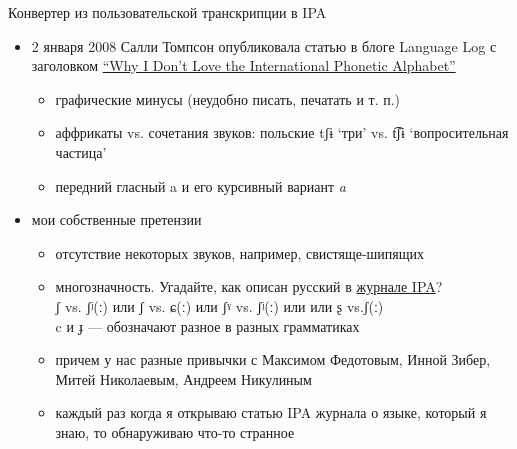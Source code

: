 \documentclass[13pt, t]{beamer}
\begin{document}
\begin{frame}{Конвертер из пользовательской транскрипции в IPA}
\begin{itemize}
\item 2 января 2008 Салли Томпсон опубликовала статью в блоге Language Log с заголовком \href{http://itre.cis.upenn.edu/~myl/languagelog/archives/005287.html}{``Why I Don't Love the International Phonetic Alphabet''}
\begin{itemize}
\item графические минусы (неудобно писать, печатать и т. п.)
\item аффрикаты vs. сочетания звуков: польские {\Large tʃɨ} `три' vs. {\Large t͡ʃɨ} `вопросительная частица'
\item передний гласный {\Large a} \pause и его курсивный вариант {\Large \textit{a}} \pause
\end{itemize}
\item мои собственные претензии
\begin{itemize}
\item отсутствие некоторых звуков, например, свистяще-шипящих
\item многозначность. Угадайте, как описан русский в \href{https://www.cambridge.org/core/services/aop-cambridge-core/content/view/55589EC639ADEF1764B5ECD0B76970FA/S0025100314000395a.pdf/russian.pdf}{журнале IPA}?\\
{\Large ʃ} vs. {\Large ʃʲ(ː)} или {\Large ʃ} vs. {\Large ɕ(ː)} или {\Large ʃˠ} vs. {\Large ʃʲ(ː)} или или {\Large ʂ} vs.{\Large  ʃ(ː)}\\
{\Large c} и {\Large ɟ} --- обозначают разное в разных грамматиках
\item причем у нас разные привычки с Максимом Федотовым, Инной Зибер, Митей Николаевым, Андреем Никулиным
\item каждый раз когда я открываю статью IPA журнала о языке, который я знаю, то обнаруживаю что-то странное
\end{itemize}
\end{itemize}
\end{frame}
\end{document}
